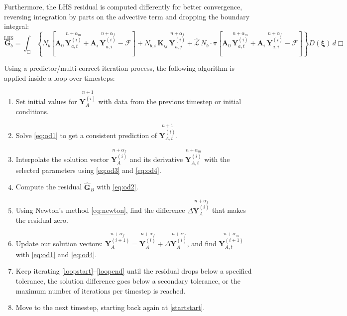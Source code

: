 \documentclass{ucb}
\begin{document}
Furthermore, the LHS residual is computed differently for better convergence, reversing integration by parts on the advective term and dropping the boundary integral:
\begin{equation}
    \overset{\mathrm{LHS}}{\bm{G}_b} = \int_\Box \left\{ N_b\left[\bm{A}_0 \, \overset{n+\alpha_m}{\bm{Y}_{a,t}^{(i)}} + \bm{A}_i \, \overset{n+\alpha_f}{\bm{Y}_{a,i}^{(i)}} - \bm{\mathcal{F}}\right] + N_{b,i} \, \bm{K}_{ij} \, \overset{n+\alpha_f}{\bm{Y}_{a,j}^{(i)}} + \hat{\mathcal{L}}\,N_b \cdot \bm{\tau}\left[\bm{A}_0 \, \overset{n+\alpha_m}{\bm{Y}_{a,t}^{(i)}} + \bm{A}_i \, \overset{n+\alpha_f}{\bm{Y}_{a,i}^{(i)}} - \bm{\mathcal{F}}\right]\right\} D(\bm{\xi}) \, d\Box
\end{equation}

\pagebreak

Using a predictor/multi-correct iteration process, the following algorithm is applied inside a loop over timesteps:
\begin{enumerate}
    \item Set initial values for $\overset{n+1}{\bm{Y}_A^{(i)}}$ with data from the previous timestep or initial conditions.
    \label{startstart}
    \item Solve \autoref{eq:od1} to get a consistent prediction of $\overset{n+1}{\bm{Y}_{A,t}^{(i)}}$.
    \item Interpolate the solution vector $\overset{n+\alpha_f}{\bm{Y}_A^{(i)}}$ and its derivative $\overset{n+\alpha_m}{\bm{Y}_{A,t}^{(i)}}$ with the selected parameters using \eqref{eq:od3} and \eqref{eq:od4}.
    \item Compute the residual $\bm{\hat{G}}_B$ with \autoref{eq:od2}.
    \label{loopstart}
    \item Using Newton's method \eqref{eq:newton}, find the difference $\Delta\overset{n+\alpha_f}{\bm{Y}_A^{(i)}}$ that makes the residual zero.
    \item Update our solution vectors: $\overset{n+\alpha_f}{\bm{Y}_A^{(i+1)}} = \overset{n+\alpha_f}{\bm{Y}_A^{(i)}} + \Delta\overset{n+\alpha_f}{\bm{Y}_A^{(i)}}$, and find $\overset{n+\alpha_m}{\bm{Y}_{A,t}^{(i+1)}}$ with \eqref{eq:od1} and \eqref{eq:od4}.
    \label{loopend}
    \item Keep iterating \ref{loopstart}--\ref{loopend} until the residual drops below a specified tolerance, the solution difference goes below a secondary tolerance, or the maximum number of iterations per timestep is reached.
    \item Move to the next timestep, starting back again at \ref{startstart}.
\end{enumerate}
\end{document}
